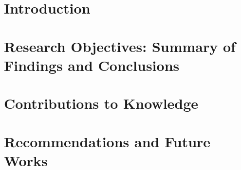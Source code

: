 \section{Introduction}
\lipsum[5]

\section{Research Objectives: Summary of Findings and Conclusions}

\section{Contributions to Knowledge}
\lipsum[5]

\section{Recommendations and Future Works}
\lipsum[5]